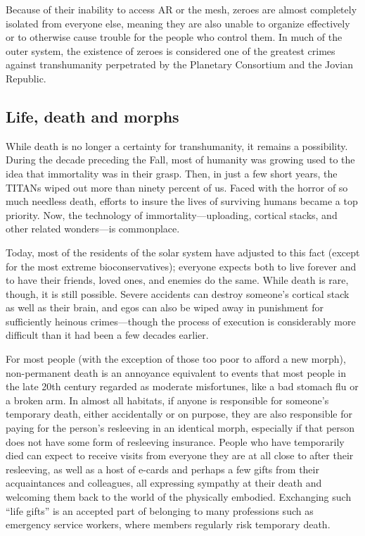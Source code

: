 Because of their inability to access AR or the mesh, zeroes are almost
completely isolated from everyone else, meaning they are also unable
to organize effectively or to otherwise cause trouble for the people
who control them. In much of the outer system, the existence of zeroes
is considered one of the greatest crimes against transhumanity
perpetrated by the Planetary Consortium and the Jovian Republic.

\subsection{Life, death and morphs}
\label{sec:life-death-morphs}

While death is no longer a certainty for transhumanity, it remains a
possibility. During the decade preceding the Fall, most of humanity
was growing used to the idea that immortality was in their
grasp. Then, in just a few short years, the TITANs wiped out more than
ninety percent of us. Faced with the horror of so much needless death,
efforts to insure the lives of surviving humans became a top
priority. Now, the technology of immortality—uploading, cortical
stacks, and other related wonders—is commonplace.

Today, most of the residents of the solar system have adjusted to this
fact (except for the most extreme bioconservatives); everyone expects
both to live forever and to have their friends, loved ones, and
enemies do the same. While death is rare, though, it is still
possible.  Severe accidents can destroy someone's cortical stack as
well as their brain, and egos can also be wiped away in punishment for
sufficiently heinous crimes—though the process of execution is
considerably more difficult than it had been a few decades earlier.

For most people (with the exception of those too poor to afford a new
morph), non-permanent death is an annoyance equivalent to events that
most people in the late 20th century regarded as moderate misfortunes,
like a bad stomach flu or a broken arm. In almost all habitats, if
anyone is responsible for someone's temporary death, either
accidentally or on purpose, they are also responsible for paying for
the person's resleeving in an identical morph, especially if that
person does not have some form of resleeving insurance. People who
have temporarily died can expect to receive visits from everyone they
are at all close to after their resleeving, as well as a host of
e-cards and perhaps a few gifts from their acquaintances and
colleagues, all expressing sympathy at their death and welcoming them
back to the world of the physically embodied. Exchanging such “life
gifts” is an accepted part of belonging to many professions such as
emergency service workers, where members regularly risk temporary
death.

